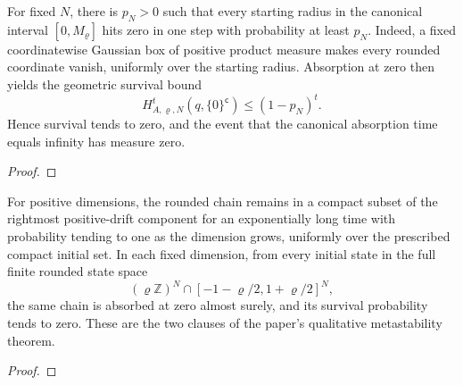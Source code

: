 \begin{lemma}
  \label{lem:uniform-rounded-absorption-chance}
  \leanok
  For fixed $N$, there is $p_N>0$ such that every starting radius in the
  canonical interval $[0,M_\varrho]$ hits zero in one step with probability
  at least $p_N$. Indeed, a fixed coordinatewise Gaussian box of positive
  product measure makes every rounded coordinate vanish, uniformly over the
  starting radius. Absorption at zero then yields the geometric survival bound
  \[
    H_{A,\varrho,N}^t(q,\{0\}^{\mathsf c})\leq(1-p_N)^t.
  \]
  Hence survival tends to zero, and the event that the canonical absorption
  time equals infinity has measure zero.
\end{lemma}
\begin{proof}\leanok\end{proof}

\begin{theorem}
  \label{thm:rounded-qualitative-metastability}
  \leanok
  For positive dimensions, the rounded chain remains in a compact subset of the
  rightmost positive-drift component for an exponentially long time with
  probability tending to one as the dimension grows, uniformly over the
  prescribed compact initial set.
  In each fixed dimension, from every initial state in the full finite rounded
  state space
  \[
    (\varrho\mathbb Z)^N\cap
    [-1-\varrho/2,1+\varrho/2]^N,
  \]
  the same chain is absorbed at zero almost surely, and its survival probability
  tends to zero. These are the two clauses of the paper's qualitative
  metastability theorem.
\end{theorem}
\begin{proof}\leanok\end{proof}

